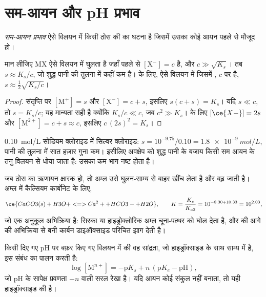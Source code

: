 \section{सम-आयन और pH प्रभाव}

\begin{definition}[सम-आयन प्रभाव]\label{def:b1:precipitation:common-ion}
\emph{सम-आयन प्रभाव} ऐसे विलयन में किसी ठोस की
 का घटना है जिसमें उसका कोई आयन पहले से
मौजूद हो।
\end{definition}

\begin{proposition}[सम आयन के साथ विलेयता]\label{prop:b1:precipitation:common-ion}
मान लीजिए MX ऐसे विलयन में घुलता है जहाँ पहले से $[\mathrm{X}^-] = c$ है, और
$c \gg \sqrt{K_s}$। तब $s \approx K_s/c$, जो शुद्ध
पानी की तुलना में कहीं कम है।  के लिए, ऐसे विलयन में जिसमें , $c$ पर है,
$s \approx \frac12\sqrt{K_s/c}$।
\end{proposition}

\begin{proof}
संतृप्ति पर $[\mathrm{M}^+] = s$ और $[\mathrm{X}^-] = c + s$, इसलिए
$s(c + s) = K_s$। यदि $s \ll c$, तो $s = K_s/c$; यह मान्यता सही है क्योंकि
$K_s/c \ll c$, जब $c^2 \gg K_s$।  के लिए $[\ce{X-}] = 2s$ और
$[\mathrm{M}^{2+}] = c + s \approx c$, इसलिए $c\,(2s)^2 = K_s$।
\end{proof}

\qty{0.10}{mol/L} सोडियम क्लोराइड में सिल्वर क्लोराइड: $s = 10^{-9.75}/0.10
= \qty{1.8e-9}{mol/L}$, पानी की तुलना में सात हज़ार गुना कम। इसीलिए
अवक्षेप को शुद्ध पानी के बजाय किसी सम आयन के तनु विलयन से धोया जाता है:
उसका कम भाग नष्ट होता है।

जब ठोस का ऋणायन क्षारक हो, तो अम्ल उसे घुलन-साम्य
से बाहर खींच लेता है और  बढ़ जाती है। अम्ल में कैल्सियम कार्बोनेट के
लिए,
\[
  \ce{CaCO3(s) + H3O+ <=> Ca^2+ + HCO3- + H2O}, \qquad
  K = \frac{K_s}{K_{a2}} = 10^{-8.30 + 10.33} = 10^{2.03} ,
\]
जो एक अनुकूल अभिक्रिया है: सिरका या हाइड्रोक्लोरिक अम्ल चूना-पत्थर को घोल देता है,
और  की आगे की अभिक्रिया से बनी कार्बन डाइऑक्साइड
परिचित झाग देती है।

\begin{proposition}[pH के सापेक्ष किसी हाइड्रॉक्साइड की विलेयता]\label{prop:b1:precipitation:hydroxide-ph}
किसी दिए गए pH पर बफ़र किए गए विलयन में  की वह सांद्रता, जो
हाइड्रॉक्साइड  के साथ साम्य में है, इस संबंध का पालन करती है:
\[
  \log[\mathrm{M}^{n+}] = -\mathrm{p}K_s + n\,(\mathrm{p}K_e - \mathrm{pH}) ,
\]
जो pH के सापेक्ष प्रवणता $-n$ वाली सरल रेखा है। यदि आयन कोई संकुल नहीं बनाता,
तो यही हाइड्रॉक्साइड की  है।
\end{proposition}

